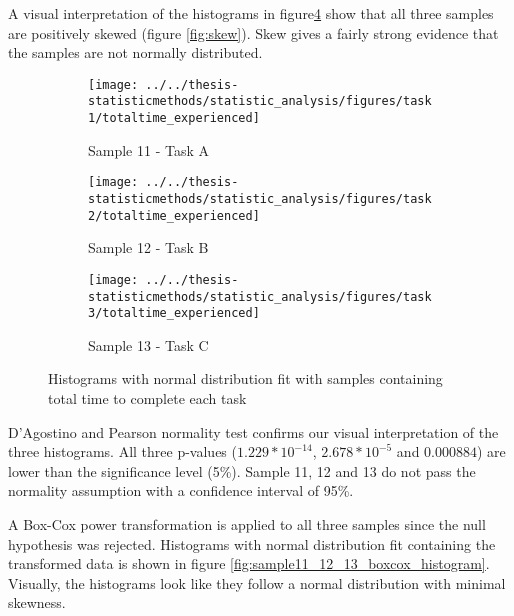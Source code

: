 A visual interpretation of the histograms in figure\ref{fig:sample11_12_13_histogram} show that all three samples are positively skewed (figure \ref{fig:skew}). Skew gives a fairly strong evidence that the samples are not normally distributed.

 \begin{figure}[H]
 	\centering
	 \begin{subfigure}[b]{0.32\textwidth}
	 	\centering
	 	\texttt{[image: ../../thesis-statisticmethods/statistic\_analysis/figures/task1/totaltime\_experienced]}
	 	\caption{Sample 11 - Task A}
	 	\label{fig:totaltimeexperienced_task1}
	 \end{subfigure}
	 \begin{subfigure}[b]{0.32\textwidth}
	 	\centering
	 	\texttt{[image: ../../thesis-statisticmethods/statistic\_analysis/figures/task2/totaltime\_experienced]}
	 	\caption{Sample 12 - Task B}
	 	\label{fig:totaltimeexperienced_task2}
	 \end{subfigure}
	 \begin{subfigure}[b]{0.32\textwidth}
	 	\centering
	 	\texttt{[image: ../../thesis-statisticmethods/statistic\_analysis/figures/task3/totaltime\_experienced]}
	 	\caption{Sample 13 - Task C}
	 	\label{fig:totaltimeexperienced}
	 \end{subfigure}
 	\caption{Histograms with normal distribution fit with samples containing total time to complete each task}
 	\label{fig:sample11_12_13_histogram}
 \end{figure}
 
D'Agostino and Pearson normality test confirms our visual interpretation of the three histograms. All three p-values ($1.229 * 10^{-14}$, $2.678 * 10^{-5}$ and $0.000884$) are lower than the significance level (5\%). Sample 11, 12 and 13 do not pass the normality assumption with a confidence interval of 95\%. 

A Box-Cox power transformation is applied to all three samples since the null hypothesis was rejected. Histograms with normal distribution fit containing the transformed data is shown in figure \ref{fig:sample11_12_13_boxcox_histogram}. Visually, the histograms look like they follow a normal distribution with minimal skewness. 

